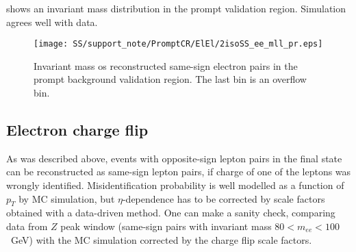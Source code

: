 \begin{table*}[htbp]
\begin{center}
\end{center}
\caption{Ratio between observed and expected same-sign pairs in the $WZ$ and $ZZ$ control region for various cuts on the dielectron invariant mass. 
The uncertainties account for both statistical and systematic errors.}
\label{tab:prompt_ratios}
\end{table*}

 shows an invariant mass distribution in the prompt validation region.
Simulation agrees well with data.

\begin{figure}[h]
\begin{center}
\texttt{[image: SS/support\_note/PromptCR/ElEl/2isoSS\_ee\_mll\_pr.eps]}
\caption{Invariant mass os reconstructed same-sign electron pairs in the prompt background validation region. The last bin is an overflow bin.}
\label{fig:prompt_CR}
\end{center}
\end{figure} 


\subsection{Electron charge flip}

As was described above, events with opposite-sign lepton pairs in the final state can be reconstructed as same-sign lepton pairs, 
if charge of one of the leptons was wrongly identified.
Misidentification probability is well modelled as a function of $p_T$ by MC simulation, 
but $\eta$-dependence has to be corrected by scale factors obtained with a data-driven method.
One can make a sanity check, comparing data from $Z$ peak window (same-sign pairs with invariant mass $80 < m_{ee} < 100$~GeV)
with the MC simulation corrected by the charge flip scale factors.

